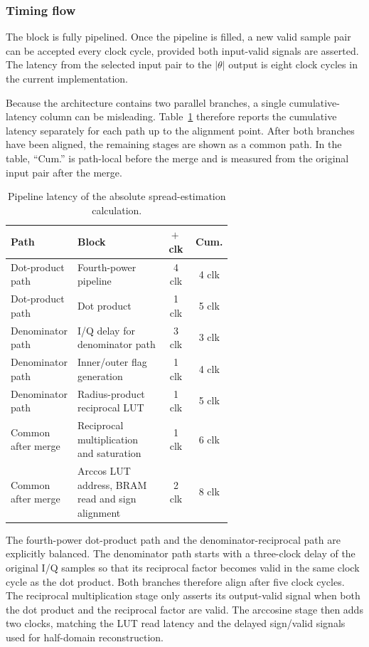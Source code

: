 \subsubsection{Timing flow}

The block is fully pipelined. Once the pipeline is filled, a new valid sample pair can be accepted every clock cycle, provided both input-valid signals are asserted. The latency from the selected input pair to the \( |\theta| \) output is eight clock cycles in the current implementation.

Because the architecture contains two parallel branches, a single cumulative-latency column can be misleading. Table~\ref{tab:spread-estimation-latency} therefore reports the cumulative latency separately for each path up to the alignment point. After both branches have been aligned, the remaining stages are shown as a common path. In the table, ``Cum.'' is path-local before the merge and is measured from the original input pair after the merge.

\begin{table}[h]
    \centering
    \caption{Pipeline latency of the absolute spread-estimation calculation.}
    \label{tab:spread-estimation-latency}
    \small
    \begin{tabular}{p{0.22\linewidth} p{0.40\linewidth} c c}
        \hline
        Path & Block & $+\,$clk & Cum. \\
        \hline
        Dot-product path & Fourth-power pipeline & 4 clk & 4 clk \\
        Dot-product path & Dot product & 1 clk & 5 clk \\
        Denominator path & I/Q delay for denominator path & 3 clk & 3 clk \\
        Denominator path & Inner/outer flag generation & 1 clk & 4 clk \\
        Denominator path & Radius-product reciprocal LUT & 1 clk & 5 clk \\
        Common after merge & Reciprocal multiplication and saturation & 1 clk & 6 clk \\
        Common after merge & Arccos LUT address, BRAM read and sign alignment & 2 clk & 8 clk \\
        \hline
    \end{tabular}
\end{table}

The fourth-power dot-product path and the denominator-reciprocal path are explicitly balanced. The denominator path starts with a three-clock delay of the original I/Q samples so that its reciprocal factor becomes valid in the same clock cycle as the dot product. Both branches therefore align after five clock cycles. The reciprocal multiplication stage only asserts its output-valid signal when both the dot product and the reciprocal factor are valid. The arccosine stage then adds two clocks, matching the LUT read latency and the delayed sign/valid signals used for half-domain reconstruction.

